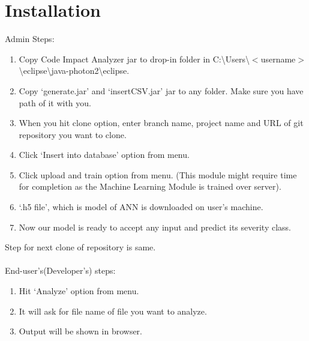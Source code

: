 \documentclass[oneside,a4paper,12pt]{book}
\begin{document}
\section{Installation}


Admin Steps:\par

\setlength{\parskip}{0.0pt}
\begin{enumerate}
	\item Copy Code Impact Analyzer jar to drop-in folder in \break C:\textbackslash Users\textbackslash $<$username$>$ \textbackslash eclipse\textbackslash java-photon2\textbackslash eclipse. \par

	\item Copy ‘generate.jar’ and ‘insertCSV.jar’ jar to any folder. Make sure you have path of it with you.\par

	\item When you hit clone option, enter branch name, project name and URL of git repository you want to clone.\par

	\item Click ‘Insert into database’ option from menu.\par

	\item Click upload and train option from menu. (This module might require time for completion as the Machine Learning Module is trained over server).\par

	\item ‘.h5 file’, which is model of ANN is downloaded on user’s machine.\par

	\item Now our model is ready to accept any input and predict its severity class.
\end{enumerate}\par

Step for next clone of repository is same.
\\
\\


End-user’s(Developer’s) steps:\par

\setlength{\parskip}{0.0pt}
\begin{enumerate}
	\item Hit ‘Analyze’ option from menu.\par

	\item It will ask for file name of file you want to analyze.\par

\setlength{\parskip}{9.96pt}
	\item Output will be shown in browser.
\end{enumerate}\par
\end{document}
